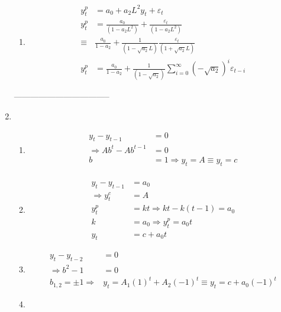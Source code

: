 \begin{enumerate}
\begin{enumerate}
		  \item %
		  
		  \begin{align*}
		   y_t^p&=a_0+a_2L^2y_t+\varepsilon_t\\
		   y_t^p&=\frac{a_0}{(1-a_2L^2)}+\frac{\varepsilon_t}{(1-a_2L^2)}\\
		   \equiv &\frac{a_0}{1-a_2}+\frac{1}{(1-\sqrt{a_2}L)}\frac{\varepsilon_t}{(1+\sqrt{a_2}L)}\\
		   y_t^p&=\frac{a_0}{1-a_2}+\frac{1}{(1-\sqrt{a_2})}\sum\limits_{i=0}^{\infty}(-\sqrt{a_2})^i\varepsilon_{t-i}
		   \end{align*}
		 
 \end{enumerate}
 
	 -----------------------------------
			
	\item %
	
	\begin{enumerate}
		\item %
		\begin{align*}
			y_t-y_{t-1}&=0\\
			\Rightarrow Ab^t-Ab^{t-1}&=0\\
			b&=1\Rightarrow y_t=A\equiv y_t=c\\
	\end{align*}
			
		\item %
		\begin{align*}
			y_t-y_{t-1}&=a_0\\
			\Rightarrow y_t^c&=A\\
			y_t^p&=kt \Rightarrow kt-k(t-1)=a_0\\
			k&=a_0 \Rightarrow y_t^p=a_0t\\
			y_t&=c+a_0t
		\end{align*}
		
		\item %
		\begin{align*}
			y_t-y_{t-2}&=0\\
			\Rightarrow b^2-1&=0\\
			b_{1,2}=\pm 1 \Rightarrow& y_t=A_1(1)^t+A_2(-1)^t\equiv y_t=c+a_0(-1)^t
		\end{align*}
		
		\item %
		

\end{enumerate}
\end{enumerate}
